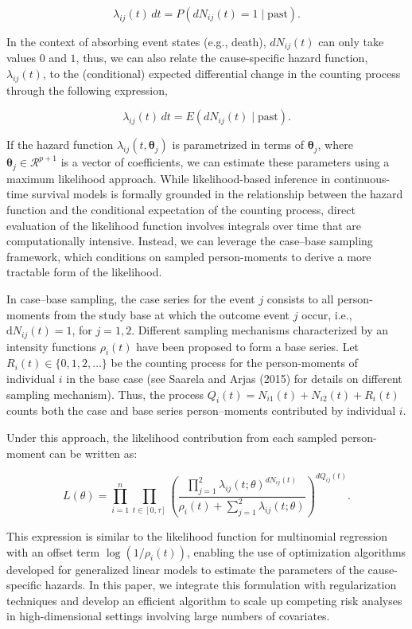 \documentclass[AMA,Times1COL]{WileyNJDv5} %
\begin{document}
$$
\lambda_{ij}(t)\,dt = P(dN_{ij}(t) = 1 \mid \text{past}).
$$

In the context of absorbing event states (e.g., death), $dN_{ij}(t)$ can only take values $0$ and $1$, thus, we can also relate the cause-specific hazard function, $\lambda_{ij}(t)$, to the (conditional) expected differential change in the counting process through the following expression,\cite{Saarela:2016} 

$$
\lambda_{ij}(t)\,dt = E(dN_{ij}(t) \mid \text{past}).
$$

If the hazard function $\lambda_{ij}(t, \boldsymbol{\theta}_j)$ is parametrized in terms of $\boldsymbol{\theta}_j$, where $\boldsymbol{\theta}_j \in \mathcal{R}^{p+1}$ is a vector of coefficients, we can estimate these parameters using a maximum likelihood approach. While likelihood-based inference in continuous-time survival models is formally grounded in the relationship between the hazard function and the conditional expectation of the counting process, direct evaluation of the likelihood function involves integrals over time that are computationally intensive. Instead, we can leverage the case–base sampling framework, which conditions on sampled person-moments to derive a more tractable form of the likelihood\cite{SaarelaArjas:2015}. 

In case–base sampling, the case series for the event $j$ consists to all person-moments from the study base at which the outcome event $j$ occur, i.e., $\mathrm{d}N_{ij}(t) = 1$, for $j = {1,2}$. Different sampling mechanisms characterized by an intensity functions $\rho_i(t)$ have been proposed to form a base series. Let $R_i(t) \in \{0, 1, 2, \ldots\}$ be the counting process for the person-moments of individual $i$ in the base case (see Saarela and Arjas (2015) for details on different sampling mechanism\cite{SaarelaArjas:2015}). Thus, the process $Q_i(t) = N_{i1}(t) + N_{i2}(t) + R_i(t)$ counts both the case and base series person–moments contributed by individual $i$.

Under this approach, the likelihood contribution from each sampled person-moment can be written as:

$$
L(\theta) = \prod_{i=1}^n \prod_{t \in [0, \tau]} \left( \frac{\prod_{j=1}^{2}\lambda_{ij}(t; \theta)^{dN_{ij}(t)}}{\rho_i(t) + \sum_{j=1}^{2}\lambda_{ij}(t; \theta)} \right)^{dQ_{ij}(t)}.
$$

This expression is similar to the likelihood function for multinomial regression with an offset term $\log(1/\rho_i(t))$, enabling the use of optimization algorithms developed for generalized linear models to estimate the parameters of the cause-specific hazards. In this paper, we integrate this formulation with regularization techniques and develop an efficient algorithm to scale up competing risk analyses in high-dimensional settings involving large numbers of covariates.
\end{document}
